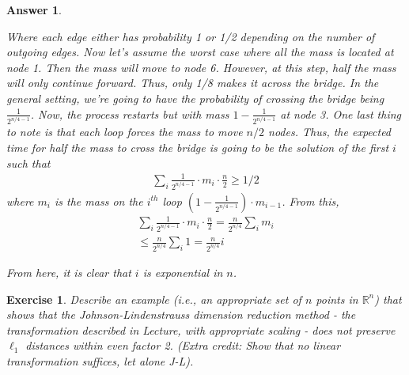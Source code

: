 \documentclass[12pt]{article}
\theoremstyle{colon}
\newtheorem{exercise}{Exercise}
\newtheorem*{answer}{Answer}
\begin{document}
\begin{answer}
\begin{center}
  \end{center}
  Where each edge either has probability 1 or 1/2 depending on the number of outgoing edges. Now let's assume the worst case where all the mass is located at node 1. Then the mass will move to node 6. However, at this step, half the mass will only continue forward. Thus, only 1/8 makes it across the bridge. In the general setting, we're going to have the probability of crossing the bridge being $\frac{1}{2^{n/4-1}}$. Now, the process restarts but with mass $1-\frac{1}{2^{n/4-1}}$ at node 3. One last thing to note is that each loop forces the mass to move $n/2$ nodes. Thus, the expected time for half the mass to cross the bridge is going to be the solution of the first $i$ such that
  \begin{gather*}
    \sum_{i} \frac{1}{2^{n/4-1}} \cdot m_i \cdot \frac{n}{2} \geq 1/2
  \end{gather*}
  where $m_i$ is the mass on the $i^{th}$ loop $(1-\frac{1}{2^{n/4-1}}) \cdot m_{i-1}$. From this,
  \begin{gather*}
    \sum_{i} \frac{1}{2^{n/4-1}} \cdot m_i \cdot \frac{n}{2} = \frac{n}{2^{n/4}} \sum_{i} m_i \\
    \leq \frac{n}{2^{n/4}} \sum_{i} 1 = \frac{n}{2^{n/4}} i
  \end{gather*}

  From here, it is clear that $i$ is exponential in $n$.
\end{answer}

\clearpage

\begin{exercise}
  Describe an example (i.e., an appropriate set of $n$ points in $\mathbb{R}^n$) that shows that the Johnson-Lindenstrauss dimension reduction method - the transformation described in Lecture, with appropriate scaling - does \textit{not} preserve $\ell_1$ distances within even factor 2. (Extra credit: Show that no \textit{linear transformation} suffices, let alone J-L).
\end{exercise}
\end{document}
